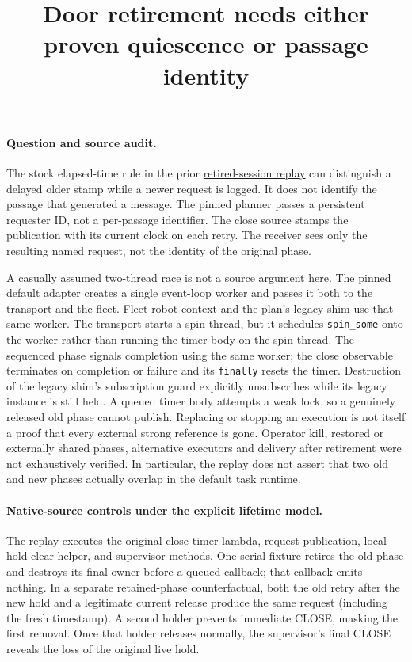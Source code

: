 \documentclass{article}
\title{Door retirement needs either proven quiescence or passage identity}
\author{}
\date{}
\begin{document}
\maketitle
\paragraph{Question and source audit.}
The stock elapsed-time rule in the prior
\href{https://github.com/eternal-november/eos-research-programmes/pull/509}{retired-session replay}
can distinguish a delayed older stamp while a newer request is
logged. It does not identify the passage that generated a message.
The pinned planner passes a persistent requester ID, not a
per-passage identifier. The close source stamps the publication
with its current clock on each retry. The receiver sees only the
resulting named request, not the identity of the original phase.

A casually assumed two-thread race is not a source argument here.
The pinned default adapter creates a single event-loop worker and
passes it both to the transport and the fleet. Fleet robot context
and the plan's legacy shim use that same worker. The transport
starts a spin thread, but it schedules \texttt{spin\_some} onto
the worker rather than running the timer body on the spin thread.
The sequenced phase signals completion using the same worker;
the close observable terminates on completion or failure and
its \texttt{finally} resets the timer. Destruction of the legacy
shim's subscription guard explicitly unsubscribes while its
legacy instance is still held. A queued timer body attempts a
weak lock, so a genuinely released old phase cannot publish.
Replacing or stopping an execution is not itself a proof that
every external strong reference is gone. Operator kill, restored
or externally shared phases, alternative executors and delivery
after retirement were not exhaustively verified. In particular,
the replay does not assert that two old and new phases actually
overlap in the default task runtime.

\paragraph{Native-source controls under the explicit lifetime model.}
The replay executes the original close timer lambda, request
publication, local hold-clear helper, and supervisor methods.
One serial fixture retires the old phase and destroys its final
owner before a queued callback; that callback emits nothing.
In a separate retained-phase counterfactual, both the old retry
after the new hold and a legitimate current release produce the
same request (including the fresh timestamp). A second holder
prevents immediate CLOSE, masking the first removal. Once that
holder releases normally, the supervisor's final CLOSE reveals
the loss of the original live hold.
\end{document}
